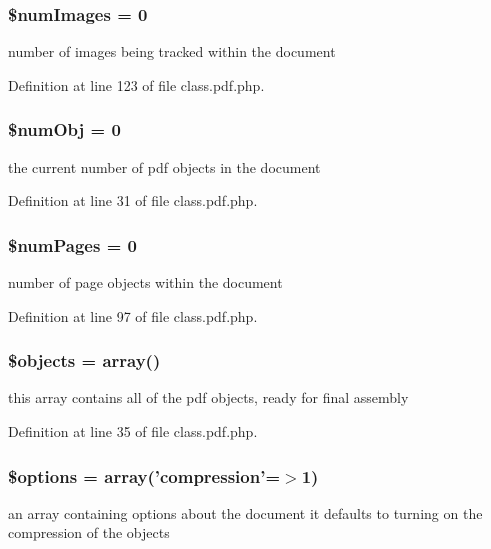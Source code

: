 \hypertarget{class_cpdf_afa03e46e7e7be49ab81a9a3599af2871}{
\subsubsection[{\$num\-Images}]{\setlength{\rightskip}{0pt plus 5cm}\$num\-Images = 0}}\label{class_cpdf_afa03e46e7e7be49ab81a9a3599af2871}
number of images being tracked within the document 

\-Definition at line 123 of file class.\-pdf.\-php.

\hypertarget{class_cpdf_a46f3313956a33faef75586addfc256a3}{
\subsubsection[{\$num\-Obj}]{\setlength{\rightskip}{0pt plus 5cm}\$num\-Obj = 0}}\label{class_cpdf_a46f3313956a33faef75586addfc256a3}
the current number of pdf objects in the document 

\-Definition at line 31 of file class.\-pdf.\-php.

\hypertarget{class_cpdf_ab340b7e706b6bd02b4f70ff942898102}{
\subsubsection[{\$num\-Pages}]{\setlength{\rightskip}{0pt plus 5cm}\$num\-Pages = 0}}\label{class_cpdf_ab340b7e706b6bd02b4f70ff942898102}
number of page objects within the document 

\-Definition at line 97 of file class.\-pdf.\-php.

\hypertarget{class_cpdf_a255f6b6db4c45b1418e9c15cf4e2bcdd}{
\subsubsection[{\$objects}]{\setlength{\rightskip}{0pt plus 5cm}\$objects = array()}}\label{class_cpdf_a255f6b6db4c45b1418e9c15cf4e2bcdd}
this array contains all of the pdf objects, ready for final assembly 

\-Definition at line 35 of file class.\-pdf.\-php.

\hypertarget{class_cpdf_a011800c63ece4cbbfa77136a20607023}{
\subsubsection[{\$options}]{\setlength{\rightskip}{0pt plus 5cm}\$options = array('compression'=$>$1)}}\label{class_cpdf_a011800c63ece4cbbfa77136a20607023}
an array containing options about the document it defaults to turning on the compression of the objects 

